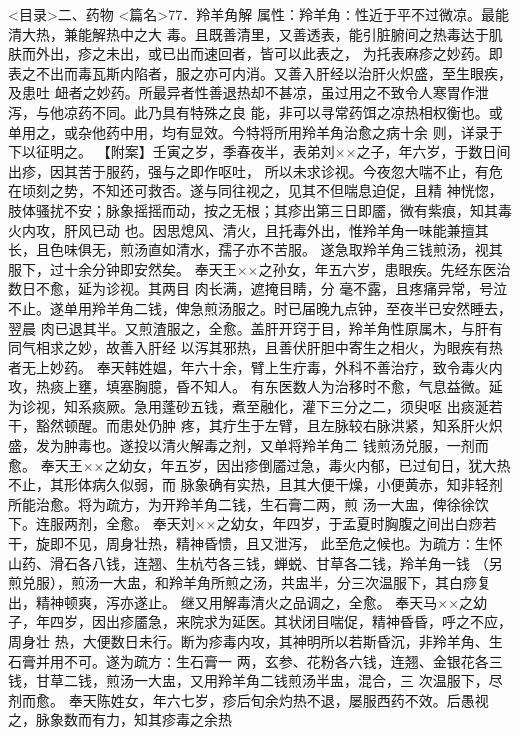 \documentclass[a4paper,12pt,UTF8,twoside]{ctexbook}
\begin{document}
<目录>二、药物
<篇名>77．羚羊角解
属性：羚羊角∶性近于平不过微凉。最能清大热，兼能解热中之大 
毒。且既善清里，又善透表，能引脏腑间之热毒达于肌肤而外出，疹之未出，或已出而速回者，皆可以此表之， 
为托表麻疹之妙药。即表之不出而毒瓦斯内陷者，服之亦可内消。又善入肝经以治肝火炽盛，至生眼疾，及患吐 
衄者之妙药。所最异者性善退热却不甚凉，虽过用之不致令人寒胃作泄泻，与他凉药不同。此乃具有特殊之良 
能，非可以寻常药饵之凉热相权衡也。或单用之，或杂他药中用，均有显效。今特将所用羚羊角治愈之病十余 
则，详录于下以征明之。 
【附案】壬寅之岁，季春夜半，表弟刘××之子，年六岁，于数日间出疹，因其苦于服药，强与之即作呕吐， 
所以未求诊视。今夜忽大喘不止，有危在顷刻之势，不知还可救否。遂与同往视之，见其不但喘息迫促，且精 
神恍惚，肢体骚扰不安；脉象摇摇而动，按之无根；其疹出第三日即靥，微有紫痕，知其毒火内攻，肝风已动 
也。因思熄风、清火，且托毒外出，惟羚羊角一味能兼擅其长，且色味俱无，煎汤直如清水，孺子亦不苦服。 
遂急取羚羊角三钱煎汤，视其服下，过十余分钟即安然矣。 
奉天王××之孙女，年五六岁，患眼疾。先经东医治数日不愈，延为诊视。其两目 肉长满，遮掩目睛，分 
毫不露，且疼痛异常，号泣不止。遂单用羚羊角二钱，俾急煎汤服之。时已届晚九点钟，至夜半已安然睡去， 
翌晨 肉已退其半。又煎渣服之，全愈。盖肝开窍于目，羚羊角性原属木，与肝有同气相求之妙，故善入肝经 
以泻其邪热，且善伏肝胆中寄生之相火，为眼疾有热者无上妙药。 
奉天韩姓媪，年六十余，臂上生疔毒，外科不善治疗，致令毒火内攻，热痰上壅，填塞胸臆，昏不知人。 
有东医数人为治移时不愈，气息益微。延为诊视，知系痰厥。急用蓬砂五钱，煮至融化，灌下三分之二，须臾呕 
出痰涎若干，豁然顿醒。而患处仍肿 
疼，其疔生于左臂，且左脉较右脉洪紧，知系肝火炽盛，发为肿毒也。遂投以清火解毒之剂，又单将羚羊角二 
钱煎汤兑服，一剂而愈。 
奉天王××之幼女，年五岁，因出疹倒靥过急，毒火内郁，已过旬日，犹大热不止，其形体病久似弱，而 
脉象确有实热，且其大便干燥，小便黄赤，知非轻剂所能治愈。将为疏方，为开羚羊角二钱，生石膏二两，煎 
汤一大盅，俾徐徐饮下。连服两剂，全愈。 
奉天刘××之幼女，年四岁，于孟夏时胸腹之间出白痧若干，旋即不见，周身壮热，精神昏愦，且又泄泻， 
此至危之候也。为疏方∶生怀山药、滑石各八钱，连翘、生杭芍各三钱，蝉蜕、甘草各二钱，羚羊角一钱 
（另煎兑服），煎汤一大盅，和羚羊角所煎之汤，共盅半，分三次温服下，其白痧复出，精神顿爽，泻亦遂止。 
继又用解毒清火之品调之，全愈。 
奉天马××之幼子，年四岁，因出疹靥急，来院求为延医。其状闭目喘促，精神昏昏，呼之不应，周身壮 
热，大便数日未行。断为疹毒内攻，其神明所以若斯昏沉，非羚羊角、生石膏并用不可。遂为疏方∶生石膏一 
两，玄参、花粉各六钱，连翘、金银花各三钱，甘草二钱，煎汤一大盅，又用羚羊角二钱煎汤半盅，混合，三 
次温服下，尽剂而愈。 
奉天陈姓女，年六七岁，疹后旬余灼热不退，屡服西药不效。后愚视之，脉象数而有力，知其疹毒之余热 
\end{document}
